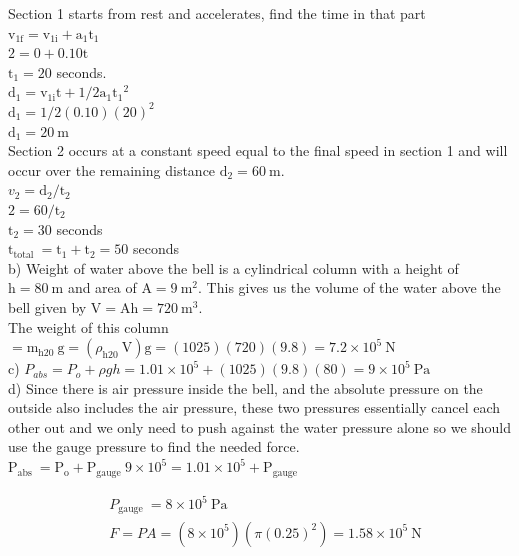 \begin{enumerate}
Section 1 starts from rest and accelerates, find the time in that part\\
$\mathrm{v}_{1 \mathrm{f}}=\mathrm{v}_{1 \mathrm{i}}+\mathrm{a}_{1} \mathrm{t}_{1}$\\
$2=0+0.10 \mathrm{t}$\\
$\mathrm{t}_{1}=20$ seconds.\\
$\mathrm{d}_{1}=\mathrm{v}_{1 \mathrm{i}} \mathrm{t}+1 / 2 \mathrm{a}_{1} \mathrm{t}_{1}{ }^{2}$\\
$\mathrm{d}_{1}=1 / 2(0.10)(20)^{2}$\\
$\mathrm{d}_{1}=20 \mathrm{~m}$\\
Section 2 occurs at a constant speed equal to the final speed in section 1 and will occur over the remaining distance $\mathrm{d}_{2}=60 \mathrm{~m}$.\\
$v_{2}=\mathrm{d}_{2} / \mathrm{t}_{2}$\\
$2=60 / \mathrm{t}_{2}$\\
$\mathrm{t}_{2}=30$ seconds\\
$\mathrm{t}_{\text {total }}=\mathrm{t}_{1}+\mathrm{t}_{2}=50$ seconds\\
b) Weight of water above the bell is a cylindrical column with a height of $\mathrm{h}=80 \mathrm{~m}$ and area of $\mathrm{A}=9 \mathrm{~m}^{2}$. This gives us the volume of the water above the bell given by $\mathrm{V}=\mathrm{Ah}=720 \mathrm{~m}^{3}$.\\
The weight of this column $=\mathrm{m}_{\mathrm{h} 20} \mathrm{~g}=\left(\rho_{\mathrm{h} 20} \mathrm{~V}\right) \mathrm{g}=(1025)(720)(9.8)=7.2 \times 10^{5} \mathrm{~N}$\\
c) $P_{a b s}=P_{o}+\rho g h=1.01 \times 10^{5}+(1025)(9.8)(80)=9 \times 10^{5} \mathrm{~Pa}$\\
d) Since there is air pressure inside the bell, and the absolute pressure on the outside also includes the air pressure, these two pressures essentially cancel each other out and we only need to push against the water pressure alone so we should use the gauge pressure to find the needed force.\\
$\mathrm{P}_{\text {abs }}=\mathrm{P}_{\mathrm{o}}+\mathrm{P}_{\text {gauge }} 9 \times 10^{5}=1.01 \times 10^{5}+\mathrm{P}_{\text {gauge }}$

$$
\begin{aligned}
& P_{\text {gauge }}=8 \times 10^{5} \mathrm{~Pa} \\
& F=P A=\left(8 \times 10^{5}\right)\left(\pi(0.25)^{2}\right)=1.58 \times 10^{5} \mathrm{~N}
\end{aligned}
$$


\end{enumerate}
